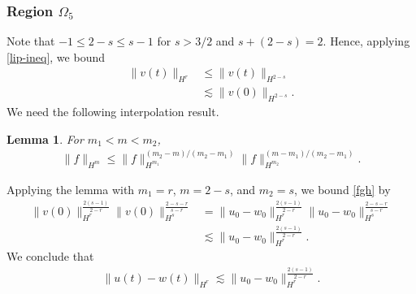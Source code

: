 \documentclass[12pt,reqno]{amsart}
\numberwithin{equation}{section}  %
\numberwithin{figure}{section}
\newtheorem{lemma}[theorem]{Lemma}
\begin{document}
\subsubsection{Region $\Omega_{5}$} 
\label{ssec:case-4}
%
%
Note that   $-1 \le 2-s \le s-1$ for $s>3/2$ and $s + (2-s) = 2$.
Hence, applying \eqref{lip-ineq}, we bound 
%
%
%
%
\begin{equation}
  \label{fgh}
\begin{split}
  \| v(t) \|_{H^{r}}
  & \le \|v(t) \|_{H^{2-s}}
  \\
  & \lesssim \|v(0) \|_{H^{2-s}}.
  \end{split}
\end{equation}
%
We need the following interpolation
result. 
%
%
%
%
%
%
%
%
\begin{lemma}
  For $m_{1} < m < m_{2}$,
  \begin{equation*}
  \begin{split}
    \| f \|_{H^{m}} \le \| f \|_{H^{m_{1}}}^{(m_{2}-m)/(m_{2} - m_{1})} \| f
    \|_{H^{m_{2}}}^{(m -m_{1})/(m_{2} - m_{1})}.
  \end{split}
  \end{equation*}
\label{lem:interp}
\end{lemma}
%
Applying the lemma with $m_{1} =r$, $m = 2-s$, and $m_{2} = s$, we bound \eqref{fgh} by
%
%
\begin{equation*}
\begin{split}
  \| v(0) \|_{H^{r}}^{\frac{2(s-1)}{2-r}} \|v(0)
  \|_{H^{s}}^{\frac{2-s-r}{s-r}}
  & = \| u_{0} - w_{0} \|_{H^{r}}^{\frac{2(s-1)}{2-r}} \|u_{0} - w_{0}
  \|_{H^{s}}^{\frac{2-s-r}{s-r}}
  \\
  & \lesssim \| u_{0} - w_{0} \|_{H^{r}}^{\frac{2(s-1)}{2-r}}.
\end{split}
\end{equation*}
%
We conclude that
%
%
\begin{equation*}
\begin{split}
  \| u(t) - w(t) \|_{H^{r}} \lesssim \|u_{0} - w_{0} \|_{H^{r}}^{\frac{2(s-1)}{2-r}}.
\end{split}
\end{equation*}
%
%
%
%
\end{document}
